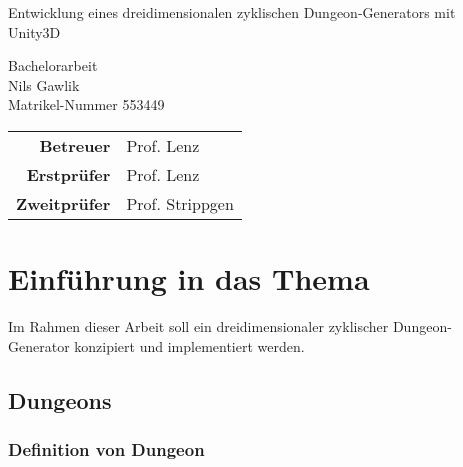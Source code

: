
\pagestyle{empty} %

\clearscrheadings\clearscrplain
\begin{center}
\begin{Huge}
Entwicklung eines dreidimensionalen zyklischen Dungeon-Generators mit Unity3D\\
\end{Huge}
\vspace{8mm}
Bachelorarbeit\\
\vspace{0.4cm}
\vspace{2 cm}
Nils Gawlik \\
Matrikel-Nummer 553449\\
\vspace{8cm}
\begin{tabular}{rl}
{\bfseries Betreuer} & Prof. Lenz \\
{\bfseries Erstprüfer}& Prof. Lenz\\
{\bfseries Zweitprüfer}& Prof. Strippgen\\
\end{tabular}

\end{center}
\clearpage


\pagestyle{useheadings} %

\tableofcontents %
\listoffigures %

\chapter{Einführung in das Thema}


Im Rahmen dieser Arbeit soll ein dreidimensionaler zyklischer Dungeon-Generator konzipiert und implementiert werden. 

\section{Dungeons}
\subsection{Definition von Dungeon}


